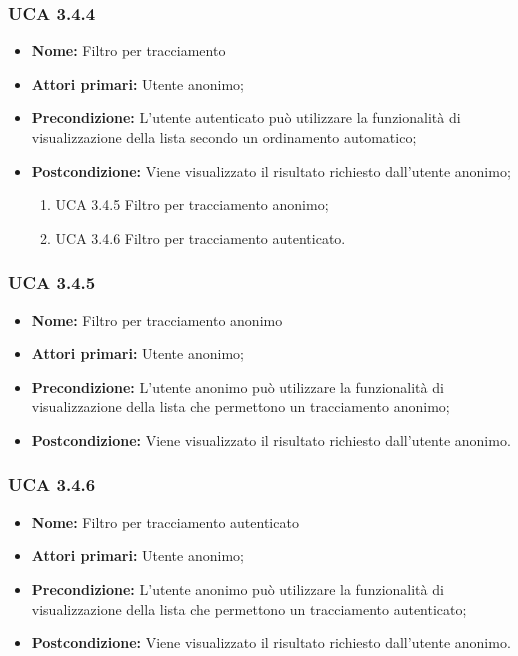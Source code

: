 \subsubsection{UCA 3.4.4}%
\begin{itemize}
	\item \textbf{Nome:} Filtro per tracciamento
	\item \textbf{Attori primari:} Utente anonimo;
	\item \textbf{Precondizione:} L’utente autenticato può utilizzare la funzionalità di visualizzazione della lista secondo un ordinamento automatico;
	\item \textbf{Postcondizione:} Viene visualizzato il risultato richiesto dall’utente anonimo;
	\begin{enumerate}
		\item UCA 3.4.5 Filtro per tracciamento anonimo;
		\item UCA 3.4.6 Filtro per tracciamento autenticato.
	\end{enumerate}
\end{itemize}

\subsubsection{UCA 3.4.5}%
\begin{itemize}
	\item \textbf{Nome:} Filtro per tracciamento anonimo
	\item \textbf{Attori primari:} Utente anonimo;
	\item \textbf{Precondizione:} L’utente anonimo può utilizzare la funzionalità di visualizzazione della lista che permettono un tracciamento anonimo;
	\item \textbf{Postcondizione:} Viene visualizzato il risultato richiesto dall’utente anonimo.
\end{itemize}

\subsubsection{UCA 3.4.6}%
\begin{itemize}
	\item \textbf{Nome:} Filtro per tracciamento autenticato
	\item \textbf{Attori primari:} Utente anonimo;
	\item \textbf{Precondizione:} L’utente anonimo può utilizzare la funzionalità di visualizzazione della lista che permettono un tracciamento autenticato;
	\item \textbf{Postcondizione:} Viene visualizzato il risultato richiesto dall’utente anonimo.
\end{itemize}

